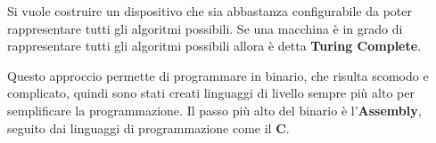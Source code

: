 \documentclass[a4paper]{article}
\theoremstyle{break}
\theoremstyle{break}
\theoremstyle{break}
\theoremstyle{break}
\begin{document}
Si vuole costruire un dispositivo che sia abbastanza configurabile da poter rappresentare tutti
gli algoritmi possibili. Se una macchina è in grado di rappresentare tutti gli algoritmi possibili
allora è detta \textbf{Turing Complete}.

Questo approccio permette di programmare in binario, che risulta scomodo e complicato, quindi sono
stati creati linguaggi di livello sempre più alto per semplificare la programmazione. Il passo
più alto del binario è l'\textbf{Assembly}, seguito dai linguaggi di programmazione come il \textbf{C}.
\end{document}

